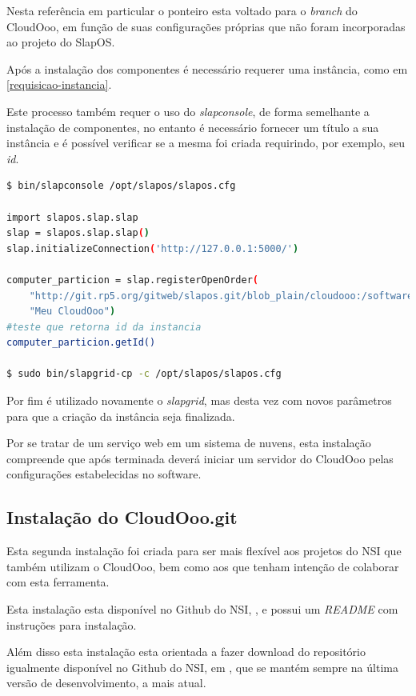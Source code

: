 Nesta referência em particular o ponteiro esta voltado para o \textit{branch} do CloudOoo, em função de suas configurações próprias que não foram incorporadas ao projeto do SlapOS.

Após a instalação dos componentes é necessário requerer uma instância, como em \ref{requisicao-instancia}.

Este processo também requer o uso do \textit{slapconsole}, de forma semelhante a instalação de componentes, no entanto é necessário fornecer um título a sua instância e é possível verificar se a mesma foi criada requirindo, por exemplo, seu \textit{id}.

{\singlespace
\begin{lstlisting}[caption=Requisição de uma instância do CloudOoo via SlapOS,language=bash,label={requisicao-instancia}]
$ bin/slapconsole /opt/slapos/slapos.cfg

import slapos.slap.slap
slap = slapos.slap.slap()
slap.initializeConnection('http://127.0.0.1:5000/')

computer_particion = slap.registerOpenOrder(
    "http://git.rp5.org/gitweb/slapos.git/blob_plain/cloudooo:/software/cloudooo/software.cfg",
    "Meu CloudOoo")
#teste que retorna id da instancia
computer_particion.getId()

$ sudo bin/slapgrid-cp -c /opt/slapos/slapos.cfg

\end{lstlisting}
}

Por fim é utilizado novamente o \textit{slapgrid}, mas desta vez com novos parâmetros para que a criação da instância seja finalizada.

Por se tratar de um serviço web em um sistema de nuvens, esta instalação compreende que após terminada deverá iniciar um servidor do CloudOoo pelas configurações estabelecidas no software.


\subsection{Instalação do CloudOoo.git}

Esta segunda instalação foi criada para ser mais flexível aos projetos do NSI que também utilizam o CloudOoo, bem como aos que tenham intenção de colaborar com esta ferramenta. 

Esta instalação esta disponível no Github do NSI, \cite{BUILD-CLOUDOOO}, e possui um \textit{README} com instruções para instalação. 

Além disso esta instalação esta orientada a fazer download do repositório igualmente disponível no Github do NSI, em \cite{NSI-CLOUDOOO}, que se mantém sempre na última versão de desenvolvimento, a mais atual.

